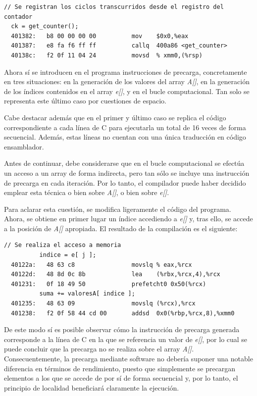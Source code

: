 \documentclass[conference]{IEEEtran}
\begin{document}
\begin{lstlisting}[style=customasm, basicstyle=\scriptsize, title=Traducción a ensamblador del bucle computacional del programa de pruebas incluyendo la precarga mediante software.]
  // Se registran los ciclos transcurridos desde el registro del contador
  ck = get_counter();
  401382:	b8 00 00 00 00       	mov    $0x0,%eax
  401387:	e8 fa f6 ff ff       	callq  400a86 <get_counter>
  40138c:	f2 0f 11 04 24       	movsd  % xmm0,(%rsp)
\end{lstlisting}

Ahora sí se introducen en el programa instrucciones de precarga, concretamente en tres situaciones: en la generación de los valores del array \textit{A[]}, en la generación de los índices contenidos en el array \textit{e[]}, y en el bucle computacional. Tan solo se representa este último caso por cuestiones de espacio.

Cabe destacar además que en el primer y último caso se replica el código correspondiente a cada línea de C para ejecutarla un total de 16 veces de forma secuencial. Además, estas líneas no cuentan con una única traducción en código ensamblador.

Antes de continuar, debe considerarse que en el bucle computacional se efectúa un acceso a un array de forma indirecta, pero tan sólo se incluye una instrucción de precarga en cada iteración. Por lo tanto, el compilador puede haber decidido emplear esta técnica o bien sobre \textit{A[]}, o bien sobre \textit{e[]}.

Para aclarar esta cuestión, se modifica ligeramente el código del programa. Ahora, se obtiene en primer lugar un índice accediendo a \textit{e[]} y, tras ello, se accede a la posición de \textit{A[]} apropiada. El resultado de la compilación es el siguiente:

\begin{lstlisting}[style=customasm, basicstyle=\scriptsize, title=Fragmento de la traducción a ensamblador del bucle computacional del programa de pruebas incluyendo la precarga mediante software.]
          // Se realiza el acceso a memoria
          indice = e[ j ];
  40122a:	48 63 c8             	movslq % eax,%rcx
  40122d:	48 8d 0c 8b          	lea    (%rbx,%rcx,4),%rcx
  401231:	0f 18 49 50          	prefetcht0 0x50(%rcx)
          suma += valoresA[ indice ];
  401235:	48 63 09             	movslq (%rcx),%rcx
  401238:	f2 0f 58 44 cd 00    	addsd  0x0(%rbp,%rcx,8),%xmm0
\end{lstlisting}

De este modo sí es posible observar cómo la instrucción de precarga generada corresponde a la línea de C en la que se referencia un valor de \textit{e[]}, por lo cual se puede concluir que la precarga no se realiza sobre el array \textit{A[]}. Consecuentemente, la precarga mediante software no debería suponer una notable diferencia en términos de rendimiento, puesto que simplemente se precargan elementos a los que se accede de por sí de forma secuencial y, por lo tanto, el principio de localidad beneficiará claramente la ejecución.
\end{document}
